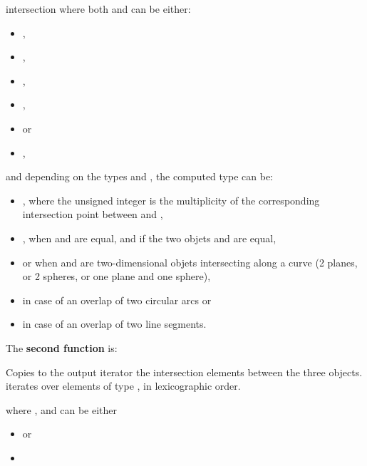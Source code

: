 \begin{ccRefFunction}{intersection}
where both  and  can be either:
\begin{itemize}
\item {} ,
\item {} ,
\item {} ,
\item {} ,
\item {}  or
\item {} ,
\end{itemize} 

and depending on the types  and , the computed 
type can be:
\begin{itemize}
\item {} ,
where the unsigned integer is the multiplicity of the corresponding
intersection point between  and ,
\item {} , when  and  are equal, 
and if the two objets  and  are equal,
\item {}  or 
 when  and  
are two-dimensional objets intersecting along a curve (2 planes, or 2
spheres, or one plane and one sphere),
\item {}  in case of an overlap of 
two circular arcs or
\item {}  in case of an overlap of two 
line segments. 
\end{itemize} 

The \textbf{second function} is:

{Copies to the output iterator the intersection elements between the
three objects.  iterates over
elements of type 
, in lexicographic order.}

where ,  and 
can be either
\begin{itemize}
\item {}  or
\item {} 
\end{itemize}


\end{ccRefFunction}
